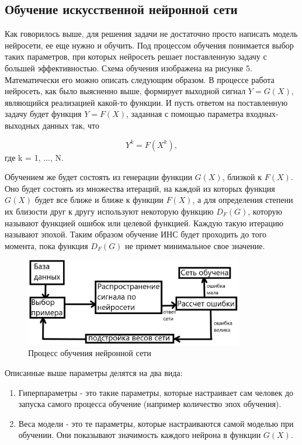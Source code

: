 \documentclass[bachelor, och, coursework]{shiza}
\begin{document}
\subsection{Обучение искусственной нейронной сети}

Как говорилось выше, для решения задачи не достаточно просто написать модель нейросети, ее еще нужно и обучить. Под процессом обучения понимается выбор
таких параметров, при которых нейросеть решает поставленную задачу с большей эффективностью. Схема обучения изображена на рисунке 5. Математически его 
можно описать следующим образом. В процессе работа нейросеть, как было выясненно выше, формирует выходной сигнал $Y = G(X)$, являющийся реализацией какой-то
функции. И пусть ответом на поставленную задачу будет функция $Y = F(X)$, заданная с помощью параметра входных-выходных данных так, что

\begin{equation}
    Y^k = F(X^k),
\end{equation}
где k = 1, ..., N.

Обучением же будет состоять из генерации функции $G(X)$, близкой к $F(X)$. Оно будет состоять из множества итераций, на каждой из которых функция $G(X)$ будет
все ближе и ближе к функции $F(X)$, а для определения степени их близости друг к другу используют некоторую функцию $D_F(G)$, которую называют функцией ошибок или
целевой функцией. Каждую такую итерацию называют эпохой. Таким образом обучение ИНС будет проходить до того момента, пока функция $D_F(G)$ не примет минимальное свое значение.

\begin{figure}[H]
    \centering
    \includegraphics[width=0.85\textwidth]{pic/5}
    \caption{Процесс обучения нейронной сети}
    \label{fig:img1}
\end{figure}

Описанные выше параметры делятся на два вида:

\begin{enumerate}
    \item Гиперпараметры - это такие параметры, которые настраивает сам человек до запуска самого процесса обучение (например количество эпох обучения).
    \item Веса модели - это те параметры, которые настраиваются самой моделью при обучении. Они показывают значимость каждого нейрона в функции $G(X)$.
\end{enumerate}
\end{document}
